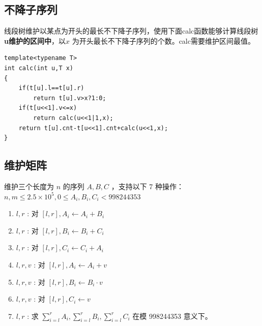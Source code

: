 \subsection{不降子序列}
\par \noindent 线段树维护以某点为开头的最长不下降子序列，使用下面calc函数能够计算线段树\textbf{u维护的区间中}，以$x$ 为开头最长不下降子序列的个数。calc需要维护区间最值。

\begin{verbatim}
template<typename T>
int calc(int u,T x)
{
    if(t[u].l==t[u].r) 
        return t[u].v>x?1:0;
    if(t[u<<1].v<=x) 
        return calc(u<<1|1,x);
    return t[u].cnt-t[u<<1].cnt+calc(u<<1,x);
}
\end{verbatim}

\subsection{维护矩阵}
\begin{tcolorbox}
\par \noindent 维护三个长度为 $n$ 的序列 $A, B, C$ ，支持以下 7 种操作：$n, m \leq 2.5 \times 10^5, 0 \leq A_{i}, B_{i}, C_{i}<998244353$
\begin{enumerate}
\item $l, r$ : 对 $[l, r], A_{i} \leftarrow A_{i}+B_{i}$
\item $l, r$ : 对 $[l, r],  B_{i} \leftarrow B_{i}+C_{i}$
\item $l, r$ : 对 $[l, r], C_{i} \leftarrow C_{i}+A_{i}$ 
\item $l, r,v$ : 对 $[l, r],  A_{i} \leftarrow A_{i}+v$
\item $l, r,v$ : 对 $[l, r],   B_{i} \leftarrow B_{i} \cdot v$ 
\item $l, r,v$ : 对 $[l, r],   C_{i} \leftarrow v$
\item $l,r$ : 求 $\sum_{i=l}^{r} A_{i}, \sum_{i=l}^{r} B_{i}, \sum_{i=l}^{r} C_{i}$ 在模 998244353 意义下。 
\end{enumerate}
\end{tcolorbox}
